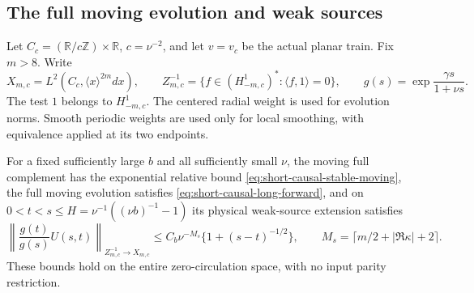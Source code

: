 \subsection{The full moving evolution and weak sources}
\label{sec:short-full-clock}

Let $C_c=(\mathbb R/c\mathbb Z)\times\mathbb R$, $c=\nu^{-2}$,
and let $v=v_c$ be the actual planar train. Fix $m>8$. Write
\[
 X_{m,c}=L^2(C_c,\langle x\rangle^{2m}dx),\qquad
 Z^{-1}_{m,c}=\{f\in(H^1_{-m,c})^*:\langle f,1\rangle=0\},
 \qquad g(s)=\exp\frac{\gamma s}{1+\nu s}.
\]
The test $1$ belongs to $H^1_{-m,c}$. The centered radial weight is
used for evolution norms. Smooth periodic weights are used only for
local smoothing, with equivalence applied at its two endpoints.

\begin{proposition}
\label{prop:short-full-clock}
For a fixed sufficiently large $b$ and all sufficiently small $\nu$,
the moving full complement has the exponential relative bound
\eqref{eq:short-causal-stable-moving}, the full moving evolution
satisfies \eqref{eq:short-causal-long-forward}, and on
$0<t<s\le H=\nu^{-1}((\nu b)^{-1}-1)$ its physical weak-source
extension satisfies
\[
 \left\|\frac{g(t)}{g(s)}U(s,t)\right\|_{Z^{-1}_{m,c}\to X_{m,c}}
 \le C_b\nu^{-M_s}\{1+(s-t)^{-1/2}\},\qquad
 M_s=\lceil m/2+|\Re\kappa|+2\rceil.
\]
These bounds hold on the entire zero-circulation space, with no
input parity restriction.
\end{proposition}
